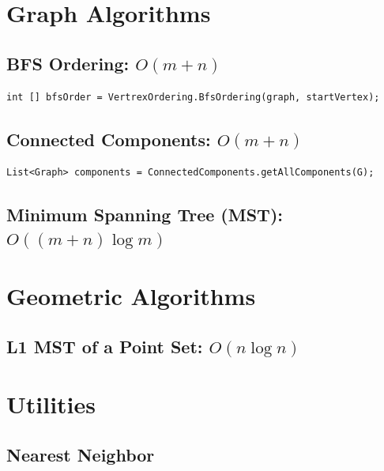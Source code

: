 \documentclass{article}
\begin{document}
\newpage
\section{Graph Algorithms}

\subsection{BFS Ordering: $O(m+n)$}
\begin{lstlisting}
int [] bfsOrder = VertrexOrdering.BfsOrdering(graph, startVertex);
\end{lstlisting}

\subsection{Connected Components: $O(m+n)$}
\begin{lstlisting}
List<Graph> components = ConnectedComponents.getAllComponents(G);
\end{lstlisting}


\subsection{Minimum Spanning Tree (MST): $O((m+n)\log m)$}

\newpage
\section{Geometric Algorithms}
\subsection{L1 MST of a Point Set: $O(n\log n)$}

\newpage
\section{Utilities}

\subsection{Nearest Neighbor}
\end{document}
